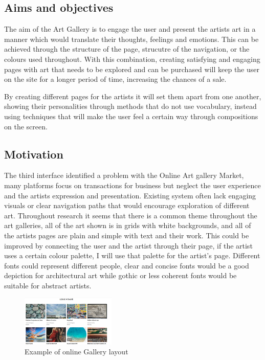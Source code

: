 \documentclass[]{project_final}
\begin{document}
\subsection{Aims and objectives}
The aim of the Art Gallery is to engage the user and present the artists art in a manner which would translate their thoughts, feelings and emotions. This can be achieved through the structure of the page, strucutre of the navigation, or the colours used throughout. With this combination, creating satisfying and engaging pages with art that needs to be explored and can be purchased will keep the user on the site for a longer period of time, increasing the chances of a sale.

By creating different pages for the artists it will set them apart from one another, showing their personalities through methods that do not use vocabulary, instead using techniques that will make the user feel a certain way through compositions on the screen.
\subsection{Motivation}
The third interface identified a problem with the Online Art gallery Market, many platforms focus on transactions for business but neglect the user experience and the artists expression and presentation. Existing system often lack engaging visuals or clear navigation paths that would encourage exploration of different art.
Throughout research it seems that there is a common theme throughout the art galleries, all of the art shown is in grids with white backgrounds, and all of the artists pages are plain and simple with text and their work. This could be improved by connecting the user and the artist through their page, if the artist uses a certain colour palette, I will use that palette for the artist’s page. Different fonts could represent different people, clear and concise fonts would be a good depiction for architectural art while gothic or less coherent fonts would be suitable for abstract artists.

\begin{figure}[ht!]
  \centering
  \includegraphics[width=0.4\textwidth]{artGalleryGrid.png}
  \vspace*{0.0cm}
  \caption{Example of online Gallery layout}
  \label{fig:1}
\end{figure}
\end{document}
